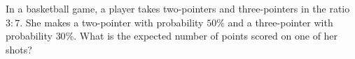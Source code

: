 In a basketball game, a player takes two-pointers and three-pointers in the ratio $3:7$. She makes a two-pointer with probability $50\%$ and a three-pointer with probability $30\%$. What is the expected number of points scored on one of her shots?
